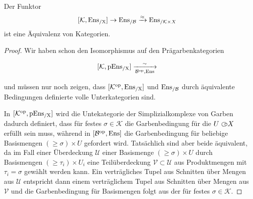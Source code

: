 \begin{satz} \label{sheaf-simp-compl}
  Der Funktor
  \[
  [\mathcal{K}, \operatorname{Ens_{/X}}] \to \operatorname{Ens_{/\mathcal{B}}} \xrightarrow{\approx} \operatorname{Ens}_{/\mathcal{K} \times X}
  \]
  ist eine Äquivalenz von Kategorien.
\end{satz}
\begin{proof}
  Wir haben schon den Isomorphismus auf den Prägarbenkategorien

  \[ [\mathcal{K}, \operatorname{pEns_{/X}}] \xrightarrow[\mathcal{B}^\mathrm{op}, \operatorname{Ens}]{\sim} \]

  und müssen nur noch zeigen, dass $[\mathcal{K}^\mathrm{op}, \operatorname{Ens_{/X}}]$ und
  $\operatorname{Ens_{/\mathcal{B}}}$ durch äquivalente Bedingungen definierte volle
  Unterkategorien sind.

  In $[\mathcal{K}^\mathrm{op}, \operatorname{pEns_{/X}}]$ wird die Untekategorie der
  Simplizialkomplexe von Garben dadurch definiert, dass für festes
  $\sigma \in \mathcal{K}$ die Garbenbedingung für die $U \subset\kern-0.58em\circ X$
  erfüllt sein muss, während in $[\mathcal{B}^\mathrm{op}, \operatorname{Ens}]$ die Garbenbedingung
  für beliebige Basismengen $(\geq \sigma) \times U$ gefordert
  wird. Tatsächlich sind aber beide äquivalent, da im Fall einer
  Überdeckung $\mathcal{U}$ einer Basismenge $(\geq \sigma) \times U$
  durch Basismengen $(\geq \tau_i) \times U_i$ eine Teilüberdeckung
  $\mathcal{V} \subset \mathcal{U}$ aus Produktmengen mit $\tau_i =
  \sigma$ gewählt werden kann. Ein verträgliches Tupel aus Schnitten
  über Mengen aus $\mathcal{U}$ entspricht dann einem verträglichem
  Tupel aus Schnitten über Mengen aus $\mathcal{V}$ und die
  Garbenbedingung für Basismengen folgt aus der für festes
  $\sigma \in \mathcal{K}$.
  
\end{proof}


